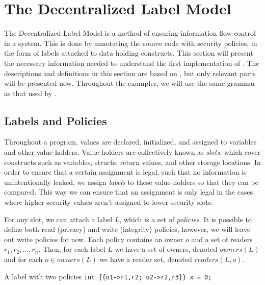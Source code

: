 
\section{The Decentralized Label Model}
The Decentralized Label Model \cite{myers1997, myers1998, myers2000} is a method of ensuring information flow control in a system.
This is done by annotating the source code with security policies, in the form of labels attached to data-holding constructs.
This section will present the necessary information needed to understand the first implementation of \thetool.
The descriptions and definitions in this section are based on \cite{myers1997, myers1998, myers2000}, but only relevant parts will be presented now.
Throughout the examples, we will use the same grammar as that used by \thetool.

\subsection{Labels and Policies}
Throughout a program, values are declared, initialized, and assigned to variables and other value-holders.
Value-holders are collectively known as \emph{slots}, which cover constructs such as variables, structs, return values, and other storage locations.
In order to ensure that a certain assignment is legal, such that no information is unintentionally leaked, we assign \emph{labels} to these value-holders so that they can be compared.
This way we can ensure that an assignment is only legal in the cases where higher-security values aren't assigned to lower-security slots.

For any slot, we can attach a label $L$, which is a set of \emph{policies}.
It is possible to define both read (privacy) and write (integrity) policies, however, we will leave out write policies for now.
Each policy contains an owner $o$ and a set of readers $r_1,r_2,\dots,r_n$.
Then, for each label $L$ we have a set of owners, denoted $owners(L)$ and for each $o \in owners(L)$ we have a reader set, denoted $readers(L, o)$.

\newcommand{\dlmpc}{$\underline{pc}$}
\newenvironment{code}{\setlength\parindent{0pt}\obeylines\ttfamily}{\par}

\begin{example}{A label with two policies}\label{dlm:ex:simple_label}
  \texttt{int \{\{o1->r1,r2; o2->r2,r3\}\} x = 0;}
\end{example}

